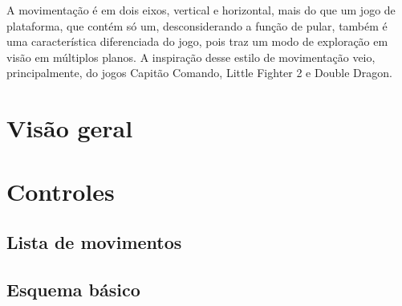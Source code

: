 \documentclass[12pt]{article}
\begin{document}
A movimentação é em dois eixos, vertical e horizontal, mais do que um jogo de
plataforma, que contém só um, desconsiderando a função de pular, também é uma
característica diferenciada do jogo, pois traz um modo de exploração em visão
em múltiplos planos. A inspiração desse estilo de movimentação veio,
principalmente, do jogos Capitão Comando, Little Fighter 2 e Double Dragon.

\section{Visão geral}

\section{Controles}

\subsection{Lista de movimentos}

\subsection{Esquema básico}
\end{document}
